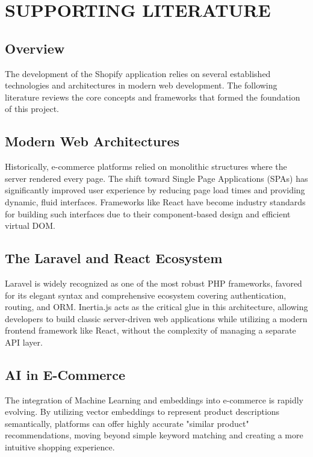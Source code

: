 \chapter{SUPPORTING LITERATURE}

\section{Overview}
The development of the Shopify application relies on several established technologies and architectures in modern web development. The following literature reviews the core concepts and frameworks that formed the foundation of this project.

\section{Modern Web Architectures}
Historically, e-commerce platforms relied on monolithic structures where the server rendered every page. The shift toward Single Page Applications (SPAs) has significantly improved user experience by reducing page load times and providing dynamic, fluid interfaces. Frameworks like React have become industry standards for building such interfaces due to their component-based design and efficient virtual DOM.

\section{The Laravel and React Ecosystem}
Laravel is widely recognized as one of the most robust PHP frameworks, favored for its elegant syntax and comprehensive ecosystem covering authentication, routing, and ORM. Inertia.js acts as the critical glue in this architecture, allowing developers to build classic server-driven web applications while utilizing a modern frontend framework like React, without the complexity of managing a separate API layer.

\section{AI in E-Commerce}
The integration of Machine Learning and embeddings into e-commerce is rapidly evolving. By utilizing vector embeddings to represent product descriptions semantically, platforms can offer highly accurate "similar product" recommendations, moving beyond simple keyword matching and creating a more intuitive shopping experience.
